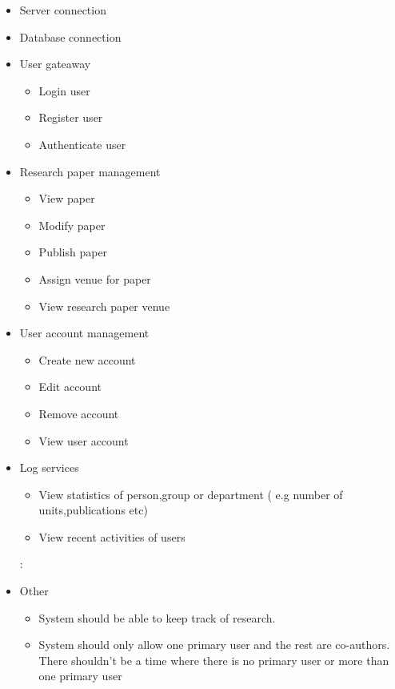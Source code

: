 \documentclass[11pt]{article}
\begin{document}
	\begin{itemize}
		\item Server connection
		\item Database connection
		\item User gateaway
		\begin{itemize}
			\item Login user
			\item Register user
			\item Authenticate user
		\end{itemize}
		\item Research paper management
		\begin{itemize}
			\item View paper
			\item Modify paper
			\item Publish paper
			\item Assign venue for paper
			\item View research paper venue
		\end{itemize}
		\item User account management
		\begin{itemize}
			\item Create new account
			\item Edit account
			\item Remove account
			\item View user account
		\end{itemize}
		\item Log services
		\begin{itemize}
			\item View statistics of person,group or department ( e.g number of units,publications etc)
			\item View recent activities of users
		\end{itemize}:
			\item Other
		\begin{itemize}
			\item System should be able to keep track of research.
		\end{itemize}
		\begin{itemize}
			\item System should only allow one primary user and the rest are co-authors. There shouldn’t be a time where there is no primary user or more than one primary user
		\end{itemize}
	\end{itemize}
	
\end{document}
